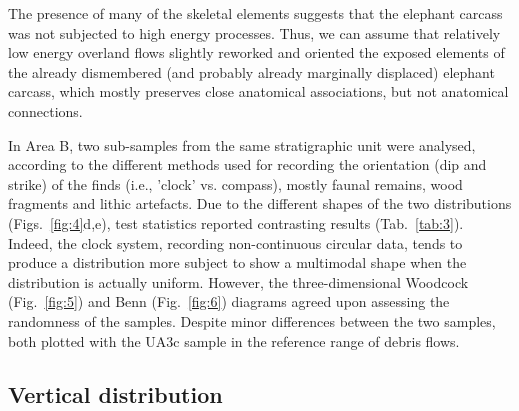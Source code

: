 \documentclass[review,authoryear,times]{elsarticle} %
\begin{document}
The presence of many of the skeletal elements suggests that the elephant carcass was not subjected to high energy processes. Thus, we can assume that relatively low energy overland flows slightly reworked and oriented the exposed elements of the already dismembered (and probably already marginally displaced) elephant carcass, which mostly preserves close anatomical associations, but not anatomical connections.


In Area B, two sub-samples from the same stratigraphic unit were analysed, according to the different methods used for recording the orientation (dip and strike) of the finds (i.e., 'clock' vs. compass), mostly faunal remains, wood fragments and lithic artefacts. Due to the different shapes of the two distributions (Figs.~\ref{fig:4}d,e), test statistics reported contrasting results (Tab.~\ref{tab:3}). Indeed, the clock system, recording non-continuous circular data, tends to produce a distribution more subject to show a multimodal shape when the distribution is actually uniform. However, the three-dimensional Woodcock (Fig.~\ref{fig:5}) and Benn (Fig.~\ref{fig:6}) diagrams agreed upon assessing the randomness of the samples. Despite minor differences between the two samples, both plotted with the UA3c sample in the reference range of debris flows.

\subsection{Vertical distribution}


\end{document}
